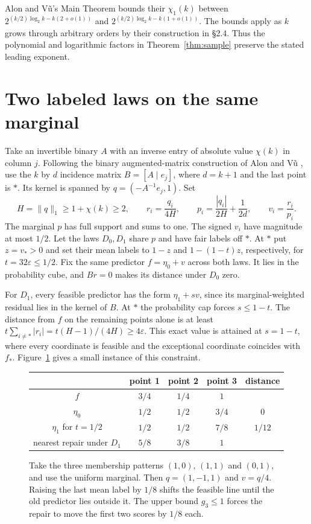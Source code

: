 \documentclass[11pt,a4paper]{amsart}
\begin{document}
Alon and V\~u's Main Theorem \cite[\S2]{alon} bounds their $\chi_1(k)$ between $2^{(k/2)\log_2 k-k(2+o(1))}$ and $2^{(k/2)\log_2 k-k(1+o(1))}$. The bounds apply as $k$ grows through arbitrary orders by their construction in \S2.4. Thus the polynomial and logarithmic factors in Theorem~\ref{thm:sample} preserve the stated leading exponent.

\section{Two labeled laws on the same marginal}
Take an invertible binary $A$ with an inverse entry of absolute value $\chi(k)$ in column $j$. Following the binary augmented-matrix construction of Alon and V\~u \cite[Proposition~3.4.3]{alon}, use the $k$ by $d$ incidence matrix $B=[A\mid e_j]$, where $d=k+1$ and the last point is $*$. Its kernel is spanned by $q=(-A^{-1}e_j,1)$. Set
\[
 H=\|q\|_1\geq1+\chi(k)\geq2,\qquad r_i=\frac{q_i}{4H},\qquad
 p_i=\frac{|q_i|}{2H}+\frac1{2d},\qquad v_i=\frac{r_i}{p_i}.
\]
The marginal $p$ has full support and sums to one. The signed $v_i$ have magnitude at most $1/2$. Let the laws $D_0,D_1$ share $p$ and have fair labels off $*$. At $*$ put $z=v_*>0$ and set their mean labels to $1-z$ and $1-(1-t)z$, respectively, for $t=32\varepsilon\leq1/2$. Fix the same predictor $f=\eta_0+v$ across both laws. It lies in the probability cube, and $B r=0$ makes its distance under $D_0$ zero.

For $D_1$, every feasible predictor has the form $\eta_1+s v$, since its marginal-weighted residual lies in the kernel of $B$. At $*$ the probability cap forces $s\leq1-t$. The distance from $f$ on the remaining points alone is at least $t\sum_{i\ne*}|r_i|=t(H-1)/(4H)\geq4\varepsilon$. This exact value is attained at $s=1-t$, where every coordinate is feasible and the exceptional coordinate coincides with $f_*$. Figure~\ref{fig:example} gives a small instance of this constraint.

\begin{figure}[t]
\centering
\begin{tabular}{c|ccc|c}
 & point 1 & point 2 & point 3 & distance\\ \hline
 $f$ & $3/4$ & $1/4$ & $1$ & \\
 $\eta_0$ & $1/2$ & $1/2$ & $3/4$ & $0$\\
 $\eta_1$ for $t=1/2$ & $1/2$ & $1/2$ & $7/8$ & $1/12$\\
 nearest repair under $D_1$ & $5/8$ & $3/8$ & $1$ &
\end{tabular}
\caption{Take the three membership patterns $(1,0)$, $(1,1)$ and $(0,1)$, and use the uniform marginal. Then $q=(1,-1,1)$ and $v=q/4$. Raising the last mean label by $1/8$ shifts the feasible line until the old predictor lies outside it. The upper bound $g_3\leq1$ forces the repair to move the first two scores by $1/8$ each.}\label{fig:example}
\end{figure}
\end{document}
